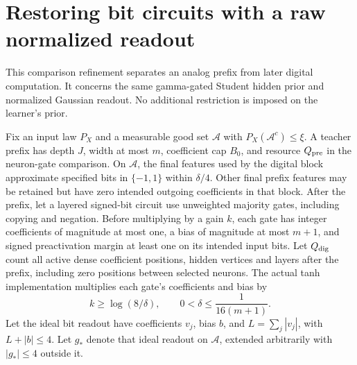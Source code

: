 \section{Restoring bit circuits with a raw normalized readout}
\label{sec:raw-restoring-bits}
This comparison refinement separates an analog prefix from later digital
computation. It concerns the same gamma-gated Student hidden prior and
normalized Gaussian readout. No additional restriction is imposed on
the learner's prior.

Fix an input law $P_X$ and a measurable good set $\mathcal A$ with
$P_X(\mathcal A^c)\le\xi$. A teacher prefix has depth $J$, width at most
$m$, coefficient cap $B_0$, and resource $Q_{\rm pre}$ in the neuron-gate
comparison. On $\mathcal A$, the final features used by the digital block approximate specified
bits in $\{-1,1\}$ within $\delta/4$. Other final prefix features may be retained but have zero intended outgoing coefficients in that block.
After the prefix, let a layered signed-bit circuit use unweighted
majority gates, including copying and negation. Before multiplying by
a gain $k$, each gate has integer coefficients of magnitude at most
one, a bias of magnitude at most $m+1$, and signed preactivation margin
at least one on its intended input bits. Let $Q_{\rm dig}$ count all
active dense coefficient positions, hidden vertices and layers after
the prefix, including zero positions between selected neurons.
The actual tanh implementation multiplies each gate's coefficients
and bias by
\[
 k\ge\log(8/\delta),\qquad
 0<\delta\le\frac1{16(m+1)}.
\]
Let the ideal bit readout have coefficients $v_j$, bias $b$, and
$L=\sum_j|v_j|$, with $L+|b|\le4$. Let $g_*$ denote that ideal readout
on $\mathcal A$, extended arbitrarily with $|g_*|\le4$ outside it.

